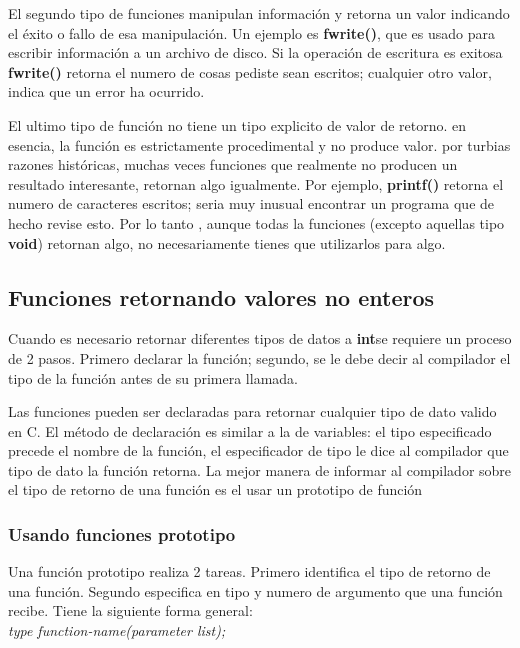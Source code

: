 \documentclass[]{article}
\begin{document}
	El segundo tipo de funciones manipulan información y retorna un valor indicando el éxito o fallo de esa manipulación. Un ejemplo es \textbf{fwrite()}, que es usado para escribir información a un archivo de disco. Si la operación de escritura es exitosa \textbf{fwrite()} retorna el numero de cosas pediste sean escritos; cualquier otro valor, indica que un error ha ocurrido.
	
	El ultimo tipo de función no tiene un tipo explicito de valor de retorno. en esencia, la función es estrictamente procedimental y no produce valor. por turbias razones históricas, muchas veces funciones que realmente no producen un resultado interesante, retornan algo igualmente. Por ejemplo, \textbf{printf()} retorna el numero de caracteres escritos; seria muy inusual encontrar un programa que de hecho revise esto. Por lo tanto , aunque todas la funciones (excepto aquellas tipo \textbf{void}) retornan algo, no necesariamente tienes que utilizarlos para algo.
	
	\subsection{Funciones retornando valores no enteros}
	
	Cuando es necesario retornar diferentes tipos de datos a \textbf{int}se requiere un proceso de 2 pasos. Primero declarar la función; segundo, se le debe decir al compilador el tipo de la función antes de su primera llamada.
	
	Las funciones pueden ser declaradas para retornar cualquier tipo de dato valido en C. El método de declaración es similar a la de variables: el tipo especificado precede el nombre de la función, el especificador de tipo le dice al compilador que tipo de dato la función retorna. La mejor manera de informar al compilador sobre el tipo de retorno de una función es el usar un prototipo de función\\
	
	\subsubsection{Usando funciones prototipo}
	
	Una función prototipo realiza 2 tareas. Primero identifica el tipo de retorno de una función. Segundo especifica en tipo y numero de argumento que una función recibe. Tiene la siguiente forma general:\\
	
	\textit{type function-name(parameter list);}\\
	
\end{document}
